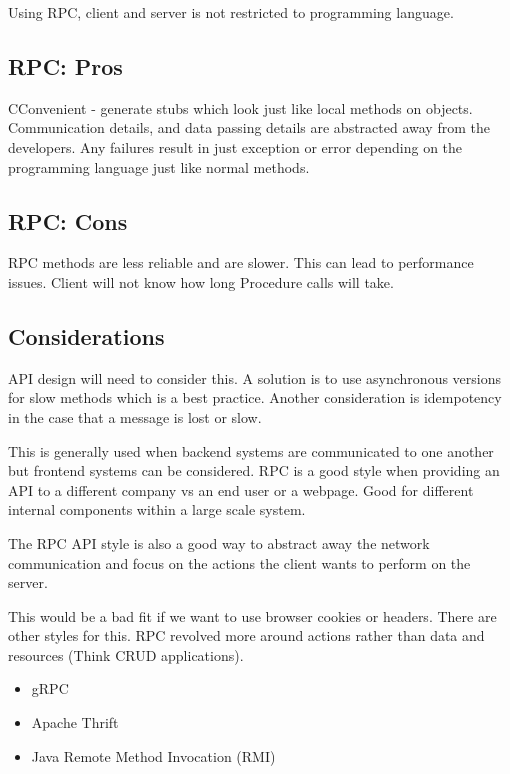 Using RPC, client and server is not restricted to programming language.

\subsection{RPC: Pros}
CConvenient - generate stubs which look just like local methods on objects.
Communication details, and data passing details are abstracted away from the developers.
Any failures result in just exception or error depending on the programming language just like normal methods.

\subsection{RPC: Cons}
RPC methods are less reliable and are slower.
This can lead to performance issues.
Client will not know how long Procedure calls will take.

\subsection{Considerations}
API design will need to consider this.
A solution is to use asynchronous versions for slow methods which is a best practice.
Another consideration is idempotency in the case that a message is lost or slow.

This is generally used when backend systems are communicated to one another but frontend systems can be considered.
RPC is a good style when providing an API to a different company vs an end user or a webpage.
Good for different internal components within a large scale system.

The RPC API style is also a good way to abstract away the network communication and focus on the actions the client wants to perform on the server.

This would be a bad fit if we want to use browser cookies or headers.
There are other styles for this.
RPC revolved more around actions rather than data and resources (Think CRUD applications).

\begin{itemize}
    \item gRPC
    \item Apache Thrift
    \item Java Remote Method Invocation (RMI)
\end{itemize}


